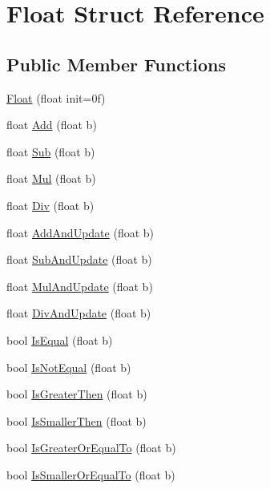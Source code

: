 \hypertarget{struct_float}{\section{Float Struct Reference}
\label{struct_float}
}
\subsection*{Public Member Functions}
\begin{DoxyCompactItemize}
\item 
\hyperlink{struct_float_a7004024e43ca3b873ee41bcfce2738c5}{Float} (float init=0f)
\item 
float \hyperlink{struct_float_a9ff499dd3ae201e026f8866db5179ca1}{Add} (float b)
\item 
float \hyperlink{struct_float_a2472249178e551dc183df271c83348ec}{Sub} (float b)
\item 
float \hyperlink{struct_float_a732e3c385809c7805fd2f8c7d3970e85}{Mul} (float b)
\item 
float \hyperlink{struct_float_a4fbbfde061f1ebf328fc77d75593436f}{Div} (float b)
\item 
float \hyperlink{struct_float_adb4624ebbd03dceb157fe922068e6b1e}{Add\+And\+Update} (float b)
\item 
float \hyperlink{struct_float_a2334a1bdf14c07b1b99038599bdb86d9}{Sub\+And\+Update} (float b)
\item 
float \hyperlink{struct_float_ae2fd19e3e38c997855cd7286474b8afb}{Mul\+And\+Update} (float b)
\item 
float \hyperlink{struct_float_a18f9e0801ba868874667e7703591bd87}{Div\+And\+Update} (float b)
\item 
bool \hyperlink{struct_float_a8303114694c5d757fa4ad8912e3c3659}{Is\+Equal} (float b)
\item 
bool \hyperlink{struct_float_a0112a13292def5891844b38ecf373ecb}{Is\+Not\+Equal} (float b)
\item 
bool \hyperlink{struct_float_a74e6971096820f723c3213783710403c}{Is\+Greater\+Then} (float b)
\item 
bool \hyperlink{struct_float_ac6a92ab7acec948b944cf365ccac697d}{Is\+Smaller\+Then} (float b)
\item 
bool \hyperlink{struct_float_afa5d327492e259cc33da0e9ba1f57ee7}{Is\+Greater\+Or\+Equal\+To} (float b)
\item 
bool \hyperlink{struct_float_a652e825527bd6b273bfaa58e02716f7a}{Is\+Smaller\+Or\+Equal\+To} (float b)
\end{DoxyCompactItemize}
